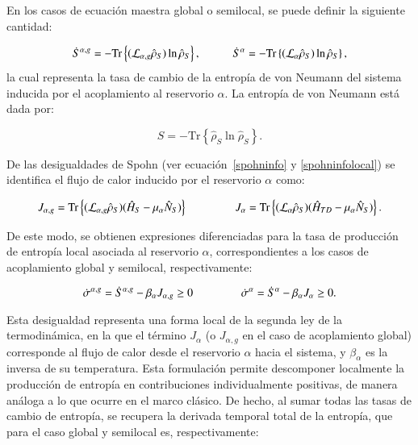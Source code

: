 En los casos de ecuación maestra global o semilocal, se puede definir la siguiente cantidad:

\begin{equation}
    \dot{S}^{\alpha,g} = - \mathrm{Tr} \left\{ (\mathcal{L}_{\alpha,g} \hat{\rho}_S) \ln \hat{\rho}_S \right\}, \hspace{10mm}
    \dot{S}^{\alpha} = - \mathrm{Tr} \left\{ (\mathcal{L}_{\alpha} \hat{\rho}_S) \ln \hat{\rho}_S \right\},
\end{equation}
la cual representa la tasa de cambio de la entropía de von Neumann del sistema inducida por el acoplamiento al reservorio $\alpha$. La entropía de von Neumann está dada por:

\begin{equation}
    S = - \mathrm{Tr} \left\{ \hat{\rho}_S \ln \hat{\rho}_S \right\}.
\end{equation}

De las desigualdades de Spohn (ver ecuación~\ref{spohninfo} y \ref{spohninfolocal}) se identifica el flujo de calor inducido por el reservorio $\alpha$ como:

\begin{equation*}
    J_{\alpha,g} =  \mathrm{Tr} \left\{ (\mathcal{L}_{\alpha,g} \hat{\rho}_S) (\hat{H}_{S}-\mu_{\alpha}\hat{N}_{S}) \right\} \hspace{15mm}
    J_{\alpha} = \mathrm{Tr} \left\{ (\mathcal{L}_{\alpha} \hat{\rho}_S) (\hat{H}_{TD}-\mu_{\alpha}\hat{N}_{S}) \right\}. 
\end{equation*}

De este modo, se obtienen expresiones diferenciadas para la tasa de producción de entropía local asociada al reservorio $\alpha$, correspondientes a los casos de acoplamiento global y semilocal, respectivamente:

\begin{equation}
    \dot{\sigma}^{\alpha,g} = \dot{S}^{\alpha,g} - \beta_{\alpha} J_{\alpha,g} \geq 0 \hspace{15mm}
    \dot{\sigma}^{\alpha} = \dot{S}^{\alpha} - \beta_{\alpha} J_{\alpha} \geq 0. 
    \label{sec4:localentropy}
\end{equation}

Esta desigualdad representa una forma local de la segunda ley de la termodinámica, en la que el término $J_\alpha$ (o $J_{\alpha,g}$ en el caso de acoplamiento global) corresponde al flujo de calor desde el reservorio $\alpha$ hacia el sistema, y $\beta_\alpha$ es la inversa de su temperatura. Esta formulación permite descomponer localmente la producción de entropía en contribuciones individualmente positivas, de manera análoga a lo que ocurre en el marco clásico. De hecho, al sumar todas las tasas de cambio de entropía, se recupera la derivada temporal total de la entropía, que para el caso global y semilocal es, respectivamente: 

